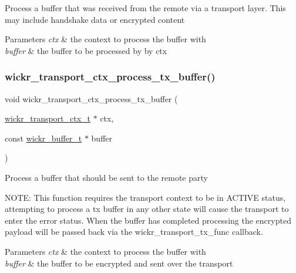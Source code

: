 Process a buffer that was received from the remote via a transport layer. This may include handshake data or encrypted content


\begin{DoxyParams}{Parameters}
{\em ctx} & the context to process the buffer with \\
\hline
{\em buffer} & the buffer to be processed by by \textquotesingle{}ctx\textquotesingle{} \\
\hline
\end{DoxyParams}
\mbox{\label{group__wickr__transport__ctx_gad9d2f86832cfb9c1948ba679fabbedbc}} 
\subsubsection{\texorpdfstring{wickr\+\_\+transport\+\_\+ctx\+\_\+process\+\_\+tx\+\_\+buffer()}{wickr\_transport\_ctx\_process\_tx\_buffer()}}
{\footnotesize\ttfamily void wickr\+\_\+transport\+\_\+ctx\+\_\+process\+\_\+tx\+\_\+buffer (\begin{DoxyParamCaption}\item[{\hyperlink{structwickr__transport__ctx}{wickr\+\_\+transport\+\_\+ctx\+\_\+t} $\ast$}]{ctx,  }\item[{const \hyperlink{structwickr__buffer}{wickr\+\_\+buffer\+\_\+t} $\ast$}]{buffer }\end{DoxyParamCaption})}

Process a buffer that should be sent to the remote party

N\+O\+TE\+: This function requires the transport context to be in A\+C\+T\+I\+VE status, attempting to process a tx buffer in any other state will cause the transport to enter the error status. When the buffer has completed processing the encrypted payload will be passed back via the wickr\+\_\+transport\+\_\+tx\+\_\+func callback.


\begin{DoxyParams}{Parameters}
{\em ctx} & the context to process the buffer with \\
\hline
{\em buffer} & the buffer to be encrypted and sent over the transport \\
\hline
\end{DoxyParams}
\mbox{\label{group__wickr__transport__ctx_gac1865750950d6ff5ba3850c5f03ab3c9}} 
